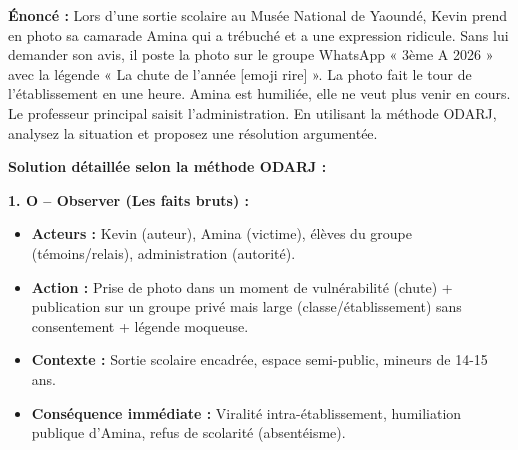 \documentclass[11pt]{article}
\begin{document}
\begin{exoresolu}
\textbf{Énoncé :} Lors d'une sortie scolaire au Musée National de Yaoundé, Kevin prend en photo sa camarade Amina qui a trébuché et a une expression ridicule. Sans lui demander son avis, il poste la photo sur le groupe WhatsApp « 3ème A 2026 » avec la légende « La chute de l'année [emoji rire] ». La photo fait le tour de l'établissement en une heure. Amina est humiliée, elle ne veut plus venir en cours. Le professeur principal saisit l'administration. En utilisant la méthode ODARJ, analysez la situation et proposez une résolution argumentée.

\tcblower
\textbf{Solution détaillée selon la méthode ODARJ :}

\textbf{1. O -- Observer (Les faits bruts) :}
\begin{itemize}
    \item \textbf{Acteurs :} Kevin (auteur), Amina (victime), élèves du groupe (témoins/relais), administration (autorité).
    \item \textbf{Action :} Prise de photo dans un moment de vulnérabilité (chute) + publication sur un groupe privé mais large (classe/établissement) sans consentement + légende moqueuse.
    \item \textbf{Contexte :} Sortie scolaire encadrée, espace semi-public, mineurs de 14-15 ans.
    \item \textbf{Conséquence immédiate :} Viralité intra-établissement, humiliation publique d'Amina, refus de scolarité (absentéisme).
\end{itemize}


\end{exoresolu}
\end{document}
